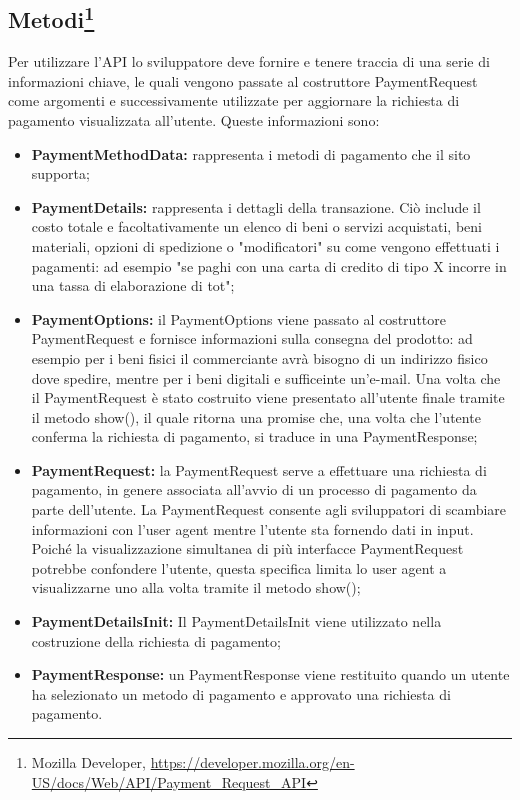 \documentclass[11pt ,a4paper , twoside , openright ]{book}
\begin{document}
	\subsection[Metodi]{Metodi\footnote{Mozilla Developer, \url{https://developer.mozilla.org/en-US/docs/Web/API/Payment_Request_API}}}
	Per utilizzare l'API lo sviluppatore deve fornire e tenere traccia di una serie di informazioni chiave, le quali vengono passate al costruttore PaymentRequest come argomenti e successivamente utilizzate per aggiornare la richiesta di pagamento visualizzata all'utente. Queste informazioni sono:
	\begin{itemize}
		\item \textbf{PaymentMethodData:} rappresenta i metodi di pagamento che il sito supporta;
		\item \textbf{PaymentDetails:} rappresenta i dettagli della transazione. Ciò include il costo totale e facoltativamente un elenco di beni o servizi acquistati, beni materiali, opzioni di spedizione o "modificatori" su come vengono effettuati i pagamenti: ad esempio "se paghi con una carta di credito di tipo X incorre in una tassa di elaborazione di tot";
		\item \textbf{PaymentOptions:} il PaymentOptions viene passato al costruttore PaymentRequest e fornisce informazioni sulla consegna del prodotto: ad esempio per i beni fisici il commerciante avrà bisogno di un indirizzo fisico dove spedire, mentre per i beni digitali e sufficeinte un'e-mail. Una volta che il PaymentRequest è stato costruito viene presentato all'utente finale tramite il metodo show(), il quale ritorna una promise che, una volta che l'utente conferma la richiesta di pagamento, si traduce in una PaymentResponse;
		\item \textbf{PaymentRequest:} la PaymentRequest serve a effettuare una richiesta di pagamento, in genere associata all'avvio di un processo di pagamento da parte dell'utente. La PaymentRequest consente agli sviluppatori di scambiare informazioni con l'user agent mentre l'utente sta fornendo dati in input. Poiché la visualizzazione simultanea di più interfacce PaymentRequest potrebbe confondere l'utente, questa specifica limita lo user agent a visualizzarne uno alla volta tramite il metodo show();
		\item \textbf{PaymentDetailsInit:} Il PaymentDetailsInit viene utilizzato nella costruzione della richiesta di pagamento;
		\item \textbf{PaymentResponse:} un PaymentResponse viene restituito quando un utente ha selezionato un metodo di pagamento e approvato una richiesta di pagamento.
	\end{itemize}
	
\end{document}
